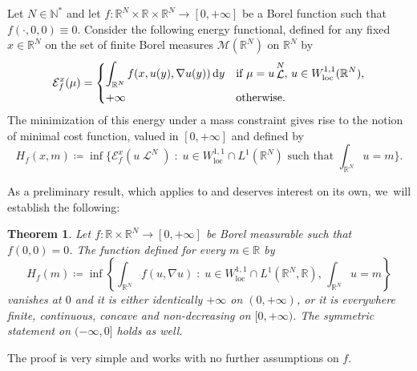 \documentclass[JEP,XML,SOM,Unicode,published]{cedram}
\theoremstyle{plain}
\newtheorem{theorem}{Theorem}[section]
\theoremstyle{definition}
\newcommand{\dd}{\mathop{}\mathopen{}\mathrm{d}}
\newcommand{\N}{\mathbb{N}}
\newcommand{\R}{\mathbb{R}}
\newcommand{\Mspace}{\mathscr{M}}
\newcommand{\ener}{\mathcal{E}}
\newcommand{\loc}{\mathrm{loc}}
\newcommand{\st}{\;:\;}
\DeclareMathOperator{\lbm}{\mathcal{L}}
\begin{document}
Let \(N\in\N^\ast\) and let \(f:\R^N\times\R\times\R^N\to[0,+\infty]\) be a Borel function such that $f(\cdot,0,0) \equiv 0$. Consider the following energy functional, defined for any fixed \(x\in\R^N\) on the set of finite Borel measures \(\Mspace(\R^N)\) on \(\R^N\) by
\begin{equation}\label{def_ener}
\ener^x_f(\mu)=
\begin{dcases}
\int_{\R^N} f(x,u(y),\nabla u(y))\dd y &\text{if } \mu = u\lbm^N,\, u\in W^{1,1}_\loc(\R^N),\\
+\infty&\text{otherwise.}
\end{dcases}
\end{equation}
The minimization of this energy under a mass constraint gives rise to the notion of minimal cost function, valued in $[0,+\infty]$ and defined by
\begin{equation}\label{def_Hf}
H_f(x,m) \coloneqq \inf\biggl\{\ener^x_f(u\lbm^N) \st u \in W^{1,1}_\loc\cap L^1(\R^N) \text{ such that } \int_{\R^N} u = m\biggr\}.
\end{equation}

As a preliminary result, which applies to  and deserves interest on its own, we~will establish the following:
\begin{theorem}\label{concaveDN}
Let $f :\R\times \R^N \to [0,+\infty]$ be Borel measurable such that $f(0,0) = 0$. The function defined for every $m\in \R$ by
\begin{equation}\label{PropertiesDefinitionH}
H_f(m) \coloneqq \inf\left\{\int_{\R^N}f(u,\nabla u)\st u\in W^{1,1}_\loc\cap L^1(\R^N,\R),\,\int_{\R^N}u=m\right\}
\end{equation}
vanishes at $0$ and it is either identically $+\infty$ on $(0,+\infty)$, or it is everywhere finite, continuous, concave and non-decreasing on \([0,+\infty)\). The symmetric statement on $(-\infty,0]$ holds as well.
\end{theorem}
\noindent The proof is very simple and works with no further assumptions on \(f\).
\end{document}
